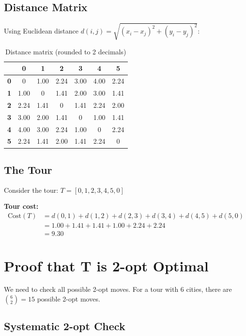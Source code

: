\documentclass[12pt,a4paper]{article}
\begin{document}
\subsection{Distance Matrix}

Using Euclidean distance $d(i,j) = \sqrt{(x_i-x_j)^2 + (y_i-y_j)^2}$:

\begin{table}[h]
\centering
\small
\begin{tabular}{|c|c|c|c|c|c|c|}
\hline
 & \textbf{0} & \textbf{1} & \textbf{2} & \textbf{3} & \textbf{4} & \textbf{5} \\
\hline
\textbf{0} & 0 & 1.00 & 2.24 & 3.00 & 4.00 & 2.24 \\
\hline
\textbf{1} & 1.00 & 0 & 1.41 & 2.00 & 3.00 & 1.41 \\
\hline
\textbf{2} & 2.24 & 1.41 & 0 & 1.41 & 2.24 & 2.00 \\
\hline
\textbf{3} & 3.00 & 2.00 & 1.41 & 0 & 1.00 & 1.41 \\
\hline
\textbf{4} & 4.00 & 3.00 & 2.24 & 1.00 & 0 & 2.24 \\
\hline
\textbf{5} & 2.24 & 1.41 & 2.00 & 1.41 & 2.24 & 0 \\
\hline
\end{tabular}
\caption{Distance matrix (rounded to 2 decimals)}
\end{table}

\subsection{The Tour}

Consider the tour: $T = [0, 1, 2, 3, 4, 5, 0]$

\textbf{Tour cost:}
\begin{align*}
\text{Cost}(T) &= d(0,1) + d(1,2) + d(2,3) + d(3,4) + d(4,5) + d(5,0) \\
&= 1.00 + 1.41 + 1.41 + 1.00 + 2.24 + 2.24 \\
&= 9.30
\end{align*}

\section{Proof that T is 2-opt Optimal}

We need to check all possible 2-opt moves. For a tour with 6 cities, there are $\binom{6}{2} = 15$ possible 2-opt moves.

\subsection{Systematic 2-opt Check}
\end{document}
